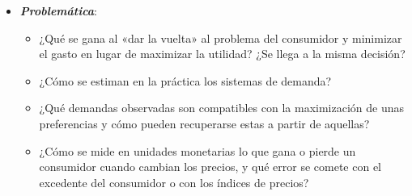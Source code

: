 \documentclass[11pt]{article}
\begin{document}
\begin{itemize}
\item \textbf{\emph{Problemática}}:
  \begin{itemize}
  \item ¿Qué se gana al «dar la vuelta» al problema del consumidor y minimizar el gasto en lugar de maximizar la utilidad? ¿Se llega a la misma decisión?
  \item ¿Cómo se estiman en la práctica los sistemas de demanda?
  \item ¿Qué demandas observadas son compatibles con la maximización de unas preferencias y cómo pueden recuperarse estas a partir de aquellas?
  \item ¿Cómo se mide en unidades monetarias lo que gana o pierde un consumidor cuando cambian los precios, y qué error se comete con el excedente del consumidor o con los índices de precios?
  \end{itemize}


\end{itemize}
\end{document}
